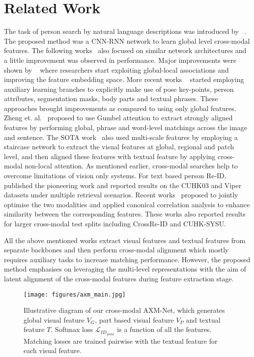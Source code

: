 \documentclass[letterpaper]{article} \usepackage{aaai22}  \usepackage{times}  \usepackage{helvet}  \usepackage{courier}  \usepackage[hyphens]{url}  \usepackage{graphicx} \urlstyle{rm} \def\UrlFont{\rm}  \usepackage{natbib}  \usepackage{caption} \DeclareCaptionStyle{ruled}{labelfont=normalfont,labelsep=colon,strut=off} \frenchspacing  \setlength{\pdfpagewidth}{8.5in}  \setlength{\pdfpageheight}{11in}  \usepackage{algorithm}
\begin{document}
\section{Related Work}
The task of person search by natural language descriptions was introduced by ~\cite{li2017person}. The proposed method was a CNN-RNN network to learn global level cross-modal features. The following works~\cite{li2017identity,chen2018Pwm} also focused on similar network architectures and a little improvement was observed in performance. Major improvements were shown by ~\cite{chen2018improving,zhang2018deep,zheng2020dual} where researchers start exploiting global-local associations and improving the feature embedding space. More recent works  ~\cite{jing2020pose,wang2020img,wang2020vitaa,aggarwal2020text} started employing auxiliary learning branches to explicitly make use of pose key-points, person attributes, segmentation masks, body parts and textual phrases. These approaches brought improvements as compared to using only global features. Zheng et. al.~\cite{gumbel2020} proposed to use Gumbel attention to extract strongly aligned features by performing global, phrase and word-level matchings across the image and sentence. The SOTA work~\cite{gao2021contextual} also used multi-scale features by employing a staircase network to extract the visual features at global, regional and patch level, and then aligned these features with textual feature by applying cross-modal non-local attention. 
As mentioned earlier, cross-modal searches help to overcome limitations of vision only systems. For text based person Re-ID,~\cite{yan2018person} published the pioneering work and reported results on the CUHK03 and Viper datasets under multiple retrieval scenarios. Recent works~\cite{farooq2020convolutional,farooq2020IJCB} proposed to jointly optimise the two modalities and applied canonical correlation analysis to enhance similarity between the corresponding features. These works also reported results for larger cross-modal test splits including CrossRe-ID and CUHK-SYSU.

All the above mentioned works extract visual features and textual features from separate backbones and then perform cross-modal alignment which mostly requires auxiliary tasks to increase matching performance. However, the proposed method emphasises on leveraging the multi-level representations with the aim of latent alignment of the cross-modal features during feature extraction stage.

\begin{figure*}
\centering
        \texttt{[image: figures/axm\_main.jpg]}
        \footnotesize{\caption{Illustrative diagram of our cross-modal AXM-Net, which generates global visual feature $V_G$, part based visual feature $V_P$ and textual feature $T$. Softmax loss $\mathcal{L}_{ID_{joint}}$ is a function of all the features. Matching losses are trained pairwise with the textual feature for each visual feature.}
    \label{block-diagram}}
\end{figure*}
\end{document}
